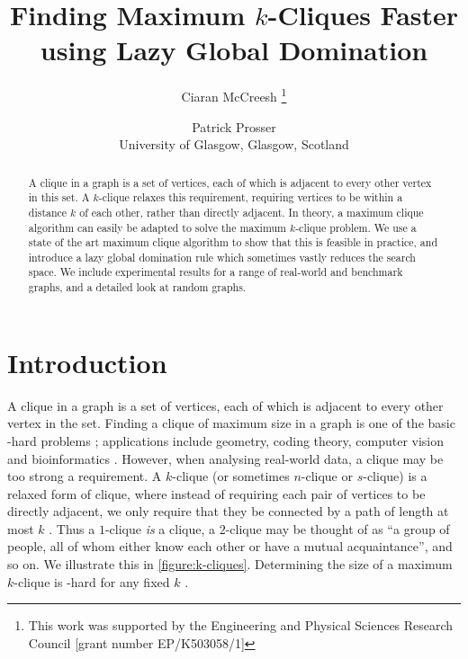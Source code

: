\documentclass[letterpaper]{article}
\begin{document}
\title{Finding Maximum $k$-Cliques Faster using Lazy Global Domination}
\author{
    Ciaran McCreesh%
    \thanks{This work was supported by the Engineering and Physical Sciences Research Council [grant number EP/K503058/1]}
    \and
    Patrick Prosser
    \\ University of Glasgow, Glasgow, Scotland
}
\maketitle

\begin{abstract}
    A clique in a graph is a set of vertices, each of which is adjacent to every other vertex in
    this set. A $k$-clique relaxes this requirement, requiring vertices to be within a distance $k$
    of each other, rather than directly adjacent. In theory, a maximum clique algorithm can easily
    be adapted to solve the maximum $k$-clique problem. We use a state of the art maximum clique
    algorithm to show that this is feasible in practice, and introduce a lazy global domination rule
    which sometimes vastly reduces the search space. We include experimental results for a range of
    real-world and benchmark graphs, and a detailed look at random graphs.
\end{abstract}

\section{Introduction}

A clique in a graph is a set of vertices, each of which is adjacent to every other vertex in the
set. Finding a clique of maximum size in a graph is one of the basic \NP-hard
problems \cite{Garey:1990}; applications include geometry, coding theory, computer vision and
bioinformatics \cite{Bomze:1999,Butenko:2006}. However, when analysing real-world data, a clique may
be too strong a requirement. A $k$-clique (or sometimes $n$-clique or $s$-clique) is a relaxed form
of clique, where instead of requiring each pair of vertices to be directly adjacent, we only require
that they be connected by a path of length at most $k$ \cite{Luce:1950}. Thus a $1$-clique \emph{is} a
clique, a $2$-clique may be thought of as ``a group of people, all of whom either know each other or
have a mutual acquaintance'', and so on. We illustrate this in \cref{figure:k-cliques}.
Determining the size of a maximum $k$-clique is \NP-hard for any fixed $k$ \cite{Bourjolly:2002}.
\end{document}
